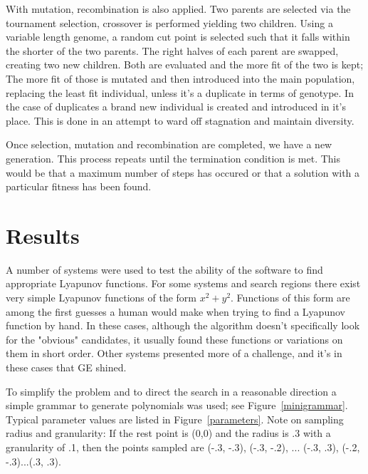 \documentclass[12pt]{article}
\begin{document}
With mutation, recombination is also applied.  Two parents are
selected via the tournament selection, crossover is performed yielding
two children.  Using a variable length genome, a random cut point is
selected such that it falls within the shorter of the two parents. The
right halves of each parent are swapped, creating two new
children. Both are evaluated and the more fit of the two is kept; The
more fit of those is mutated and then introduced into the main
population, replacing the least fit individual, unless it's a
duplicate in terms of genotype. In the case of duplicates a brand new
individual is created and introduced in it's place. This is done in an
attempt to ward off stagnation and maintain diversity.

Once selection, mutation and recombination are completed, we have a
new generation.  This process repeats until the termination condition
is met.  This would be that a maximum number of steps has occured or
that a solution with a particular fitness has been found. 

\section{Results}

A number of systems were used to test the ability of the software to find 
appropriate Lyapunov functions. For some systems and search regions there 
exist very simple Lyapunov functions of the form $x^2 + y^2$. Functions of 
this form are among the first guesses a human would make when trying to find 
a Lyapunov function by hand. In these cases, although the algorithm doesn't
specifically look for the "obvious" candidates, it usually found these functions
 or variations on them in short order. Other systems 
presented more of a challenge, and it's in these cases that GE shined. 


To simplify the problem and to direct the search in a reasonable
direction a simple grammar to generate polynomials was used; see
Figure~\ref{minigrammar}. Typical parameter values are listed in
Figure~\ref{parameters}.  Note on sampling radius and granularity: If
the rest point is (0,0) and the radius is .3 with a granularity of .1,
then the points sampled are (-.3, -.3), (-.3, -.2), ... (-.3, .3),
(-.2, -.3)...(.3, .3).  
\end{document}
